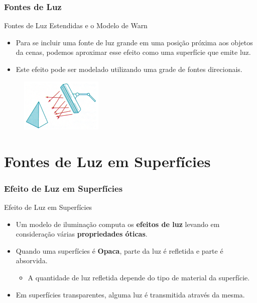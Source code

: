 \documentclass{beamer}
\begin{document}
\begin{frame}
\frametitle{Fontes de Luz}

	\begin{block}{Fontes de Luz Estendidas e o Modelo de Warn}
		\begin{itemize}
			\item Para se incluir uma fonte de luz grande em uma posição próxima aos objetos da cenas, podemos aproximar esse efeito como uma superfície que emite luz.
			\item Este efeito pode ser modelado utilizando uma grade de fontes direcionais.
		\end{itemize}
	\end{block}
	
	\begin{figure}[!h]
			\begin{center}
			\includegraphics[width=0.35\textwidth]{Figures/FonLuzGra}
			\end{center}
	\end{figure}	
	
\end{frame}


\section{Fontes de Luz em Superfícies}
\begin{frame}
\frametitle{Efeito de Luz em Superfícies}

	\begin{block}{Efeito de Luz em Superfícies}
		\begin{itemize}
			\item Um modelo de iluminação computa os \textbf{efeitos de luz} levando em consideração 	várias \textbf{propriedades óticas}.
			\item Quando uma superfícies é \textbf{Opaca}, parte da luz é refletida e parte é absorvida.
			\begin{itemize}
				\item A quantidade de luz refletida depende do tipo de material da superfície.
			\end{itemize}
			\item Em superfícies transparentes, alguma luz é transmitida através da mesma.
		\end{itemize}
	\end{block}
	
\end{frame}
\end{document}
